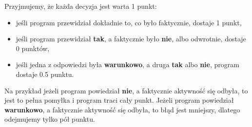 \documentclass[a4paper,12pt]{article}
\begin{document}
\noindent
Przyjmujemy, że każda decyzja jest warta 1 punkt:

\begin{itemize}
    \item jeśli program przewidział dokładnie to, co było faktycznie, dostaje 1 punkt,
    \item jeśli program przewidział \textbf{tak}, a faktycznie było \textbf{nie}, albo odwrotnie, dostaje 0 punktów,
    \item jeśli jedna z odpowiedzi była \textbf{warunkowo}, a druga \textbf{tak} albo \textbf{nie}, program dostaje 0.5 punktu.
\end{itemize}

\noindent
Na przykład jeżeli program powiedział \textbf{nie}, a faktycznie aktywność się
odbyła, to jest to pełna pomyłka i program traci cały punkt. Jeżeli program
powiedział \textbf{warunkowo}, a faktycznie aktywność się odbyła, to błąd jest
mniejszy, dlatego odejmujemy tylko pół punktu.
\end{document}
